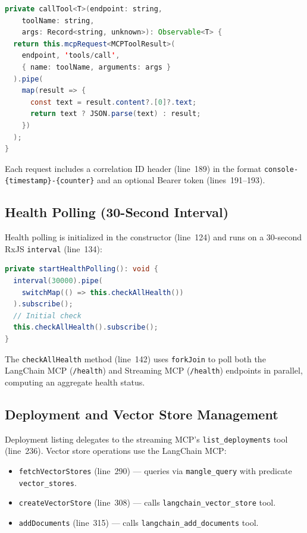 \documentclass[11pt]{article}
\newcommand{\code}[1]{\texttt{#1}}
\begin{document}
\begin{lstlisting}[language=Java,caption={Angular tool invocation (mcp.service.ts lines 219--229)},label=lst:angular-tool]
private callTool<T>(endpoint: string,
    toolName: string,
    args: Record<string, unknown>): Observable<T> {
  return this.mcpRequest<MCPToolResult>(
    endpoint, 'tools/call',
    { name: toolName, arguments: args }
  ).pipe(
    map(result => {
      const text = result.content?.[0]?.text;
      return text ? JSON.parse(text) : result;
    })
  );
}
\end{lstlisting}

Each request includes a correlation ID header (line~189) in the format
\code{console-\{timestamp\}-\{counter\}} and an optional Bearer token
(lines~191--193).

\subsection{Health Polling (30-Second Interval)}

Health polling is initialized in the constructor (line~124) and runs on
a 30-second RxJS \code{interval} (line~134):

\begin{lstlisting}[language=Java,caption={Health polling (mcp.service.ts lines 133--140)},label=lst:health-poll]
private startHealthPolling(): void {
  interval(30000).pipe(
    switchMap(() => this.checkAllHealth())
  ).subscribe();
  // Initial check
  this.checkAllHealth().subscribe();
}
\end{lstlisting}

The \code{checkAllHealth} method (line~142) uses \code{forkJoin} to
poll both the LangChain MCP (\code{/health}) and Streaming MCP
(\code{/health}) endpoints in parallel, computing an aggregate
health status.

\subsection{Deployment and Vector Store Management}

Deployment listing delegates to the streaming MCP's
\code{list\_deployments} tool (line~236).  Vector store operations use
the LangChain MCP:

\begin{itemize}
  \item \code{fetchVectorStores} (line~290) --- queries via
        \code{mangle\_query} with predicate \code{vector\_stores}.
  \item \code{createVectorStore} (line~308) --- calls
        \code{langchain\_vector\_store} tool.
  \item \code{addDocuments} (line~315) --- calls
        \code{langchain\_add\_documents} tool.
\end{itemize}
\end{document}
